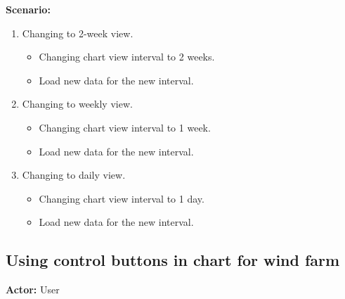 \textbf{Scenario:}
\begin{enumerate}
\item Changing to 2-week view.
\begin{itemize}
\item Changing chart view interval to 2 weeks.
\item Load new data for the new interval.
\end{itemize}
\item Changing to weekly view.
\begin{itemize}
\item Changing chart view interval to 1 week.
\item Load new data for the new interval.
\end{itemize}
\item Changing to daily view.
\begin{itemize}
\item Changing chart view interval to 1 day.
\item Load new data for the new interval.
\end{itemize}
\end{enumerate}

\subsection{Using control buttons in chart for wind farm}
\textbf{Actor:} User

